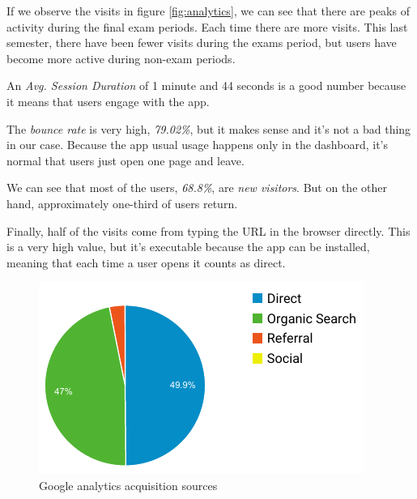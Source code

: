 If we observe the visits in figure \ref{fig:analytics}, we can see that there are peaks of activity during the final exam periods. Each time there are more visits. This last semester, there have been fewer visits during the exams period, but users have become more active during non-exam periods.

An \textit{Avg. Session Duration} of 1 minute and 44 seconds is a good number because it means that users engage with the app.

The \textit{bounce rate} is very high, \textit{79.02\%}, but it makes sense and it's not a bad thing in our case. Because the app usual usage happens only in the dashboard, it's normal that users just open one page and leave.

We can see that most of the users, \textit{68.8\%}, are \textit{new visitors}. But on the other hand, approximately one-third of users return.

Finally, half of the visits come from typing the URL in the browser directly. This is a very high value, but it's executable because the app can be installed, meaning that each time a user opens it counts as direct.

\vfill
\begin{figure}[h!]
    \center
    \includegraphics[width=0.5\columnwidth]{media/analytics-acquisition.pdf}
    \caption{Google analytics acquisition sources}
    \label{fig:analytics-acquisition}
\end{figure}
\vfill

\clearpage\newpage\null

